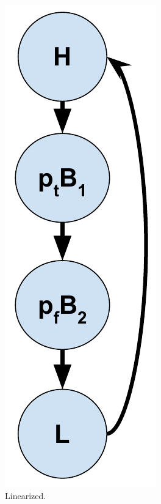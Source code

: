 \begin{figure}
     \begin{subfigure}[b]{0.25\columnwidth}
         \centering
         \includegraphics[height=0.17\textheight]{Figures/02-background/simple-loop-predicated-cfg.pdf}
         \caption{Linearized.}
         \label{fig:simple-loop-predicated-cfg}
     \end{subfigure}
     \begin{subfigure}[b]{0.3225\columnwidth}
         \centering

\end{subfigure}
\end{figure}
